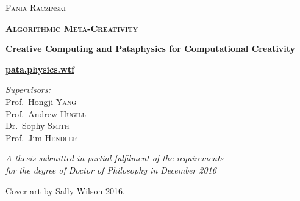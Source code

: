 \begin{titlingpage}
\begin{center}
\textsc{\huge \href{http://fania.uk}{Fania Raczinski}}

\vspace{2cm}


\textsc{\bfseries\scshape\sffamily \fontsize{40}{30}\selectfont Algorithmic Meta-Creativity}

\vspace{1.5cm}

{\huge \bfseries Creative Computing and Pataphysics for Computational Creativity}

\vspace{1.5cm}
{\Huge \textbf{\url{pata.physics.wtf}}}
\vspace{2cm}

\emph{Supervisors:}\\
{Prof.\ Hongji \textsc{Yang}}\\
{Prof.\ Andrew \textsc{Hugill}}\\
{Dr.\ Sophy \textsc{Smith}}\\
{Prof.\ Jim \textsc{Hendler}}

\vfill

\large \emph{A thesis submitted in partial fulfilment of the requirements\\ for the degree of Doctor of Philosophy in December 2016}


\end{center}

\clearpage

\vspace*{\fill}

Cover art by Sally Wilson 2016.

\end{titlingpage}
